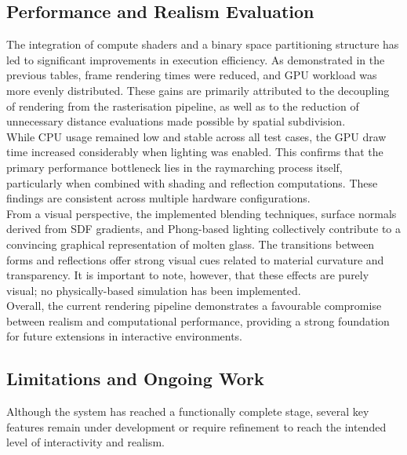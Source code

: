 \documentclass{rapportcs}
\begin{document}
    \newpage
    
    \subsection{Performance and Realism Evaluation}
    
        The integration of compute shaders and a binary space partitioning structure has led to significant improvements in execution efficiency. As demonstrated in the previous tables, frame rendering times were reduced, and GPU workload was more evenly distributed. These gains are primarily attributed to the decoupling of rendering from the rasterisation pipeline, as well as to the reduction of unnecessary distance evaluations made possible by spatial subdivision.\\
        
        \noindent While CPU usage remained low and stable across all test cases, the GPU draw time increased considerably when lighting was enabled. This confirms that the primary performance bottleneck lies in the raymarching process itself, particularly when combined with shading and reflection computations. These findings are consistent across multiple hardware configurations.\\
        
        \noindent From a visual perspective, the implemented blending techniques, surface normals derived from SDF gradients, and Phong-based lighting collectively contribute to a convincing graphical representation of molten glass. The transitions between forms and reflections offer strong visual cues related to material curvature and transparency. It is important to note, however, that these effects are purely visual; no physically-based simulation has been implemented.\\
        
        \noindent Overall, the current rendering pipeline demonstrates a favourable compromise between realism and computational performance, providing a strong foundation for future extensions in interactive environments.
    
    \newpage
    
    \subsection{Limitations and Ongoing Work}
    
        Although the system has reached a functionally complete stage, several key features remain under development or require refinement to reach the intended level of interactivity and realism.\\
\end{document}
